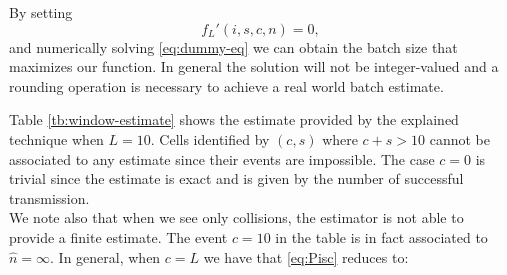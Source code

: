 \documentclass[11pt,a4paper,twoside,openright]{book}
\newcommand{\fw}{f_{L}}
\begin{document}
By setting 
\begin{equation}
\fw'(i,s,c,n)=0,
\label{eq:dummy-eq}
\end{equation}
and numerically solving \eqref{eq:dummy-eq} we can obtain the batch size that maximizes our function. In general the solution will not be integer-valued and a rounding operation is necessary to achieve a real world batch estimate.\\
\begin{table}[H]
\centering
\caption[\emph{Window Based Estimate}: Possible estimates when $L=10$]{Estimate given $(i,c,s)$ when $L=i+c+s =10$.}
\label{tb:window-estimate}
\end{table}

Table \ref{tb:window-estimate} shows the estimate provided by the explained technique when $L=10$. Cells identified by $(c,s)$ where $c+s>10$ cannot be associated to any estimate since their events are impossible. The case $c=0$ is trivial since the estimate is exact and is given by the number of successful transmission.\\
We note also that when we see only collisions, the estimator is not able to provide a finite estimate. The event $c=10$ in the table is in fact associated to $\hat{n}=\infty$. In general, when $c=L$ we have that \eqref{eq:Pisc} reduces to:
\end{document}
